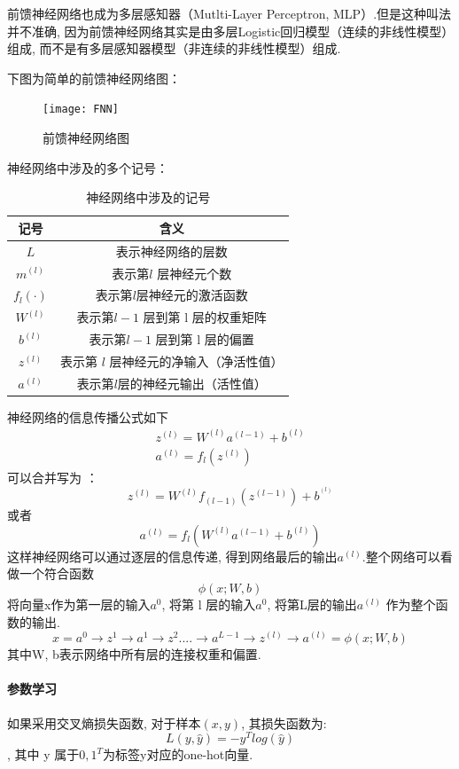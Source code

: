 前馈神经网络也成为多层感知器（Mutlti-Layer Perceptron, MLP）.但是这种叫法并不准确, 因为前馈神经网络其实是由多层Logistic回归模型（连续的非线性模型）组成, 而不是有多层感知器模型（非连续的非线性模型）组成.

下图为简单的前馈神经网络图：

\begin{figure}[!ht]
    \centering
    \texttt{[image: FNN]}
    \caption{前馈神经网络图}
\end{figure} 


神经网络中涉及的多个记号：
\begin{table}[!ht]
    \renewcommand{\arraystretch}{1.35}  
    \centering
    \begin{tabular}{cc}
        \toprule
        记号 & 含义 \\
        \midrule
        $L$ &表示神经网络的层数\\
$m^{(l)}$&表示第$ l$ 层神经元个数\\
$f_l ( \cdot ) $&表示第$ l $层神经元的激活函数\\
$W^{(l)}$   &表示第$ l-1$ 层到第 l 层的权重矩阵\\
$b^{(l)}$   &表示第$ l-1$ 层到第 l 层的偏置\\
$z^{(l)}$   &表示第 $l$ 层神经元的净输入（净活性值）\\
$a^{(l)}$   &表示第$l$层的神经元输出（活性值）\\
        \bottomrule
    \end{tabular}
\label{tabel:NerualNetwork_mark}
\caption{神经网络中涉及的记号}
\end{table}

神经网络的信息传播公式如下 
\begin{gather*}
 z^{(l)} = W^{(l)}   a^{(l-1)} + b^{(l)}\\
 a^{(l)} = f_l(z^{(l)})
\end{gather*} 
 可以合并写为 ：
$$z^{(l)}=W^{(l)} f_{(l-1)} (z^{(l-1)})+b^{^{(l)}}  $$
或者 
$$a^{(l)} = f_l(W^{(l)} a^{(l-1)} + b^{(l)})$$
这样神经网络可以通过逐层的信息传递, 得到网络最后的输出$a^{(l)}$.整个网络可以看做一个符合函数$$\phi (x; W, b)$$
将向量x作为第一层的输入$a^0$, 将第 l 层的输入$a^0$,  将第L层的输出$a^{(l)}$ 作为整个函数的输出.
$$ x = a^0 \rightarrow z^1 \rightarrow a^1 \rightarrow z^2 .... \rightarrow a^{L-1} \rightarrow z^{(l)} \rightarrow a^{(l)} = \phi (x;W, b)$$
其中W,  b表示网络中所有层的连接权重和偏置. 
\paragraph{参数学习}
如果采用交叉熵损失函数, 对于样本$(x, y)$, 其损失函数为:
$$L(y, \hat{y}) = -y^T log (\hat{y})$$, 
其中 y 属于${0, 1}^T$为标签y对应的one-hot向量.

